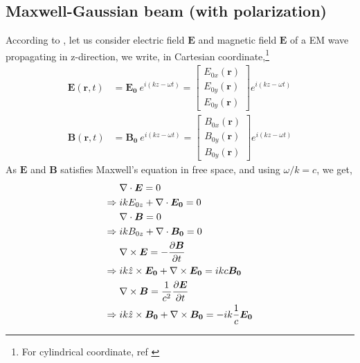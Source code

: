 \documentclass[11pt,a4paper]{article}
\numberwithin{equation}{section}
\begin{document}
\subsection{Maxwell-Gaussian beam (with polarization)}
According to \cite{erikson 94}, let us consider electric field $\boldsymbol{E}$ and magnetic field $\boldsymbol{E}$ of a EM wave propagating in z-direction, we write, in Cartesian coordinate,\footnote{For cylindrical coordinate, ref \cite{lewis 14}}
\begin{align}
	\boldsymbol{E}(\boldsymbol{r},t)
	&= \boldsymbol{E_0}\: e^{i(kz - \omega t)}
	= \begin{bmatrix}
		E_{0x}(\boldsymbol{r})\\E_{0y}(\boldsymbol{r})\\E_{0y}(\boldsymbol{r})
	\end{bmatrix} e^{i(kz - \omega t)}\\
	\boldsymbol{B}(\boldsymbol{r},t)
	&= \boldsymbol{B_0}\: e^{i(kz - \omega t)}
	= \begin{bmatrix}
		B_{0x}(\boldsymbol{r})\\B_{0y}(\boldsymbol{r})\\B_{0y}(\boldsymbol{r})
	\end{bmatrix} e^{i(kz - \omega t)}
\end{align}
As $\boldsymbol{E}$ and $\boldsymbol{B}$ satisfies Maxwell's equation in free space, \cite{max eq - wiki} and using $\omega/k = c$, we get,
\begin{align}
	&\nabla\cdot\boldsymbol{E}=0\\
	\Rightarrow\;& ikE_{0z}+\nabla\cdot\boldsymbol{E_0}=0\label{eq:2.65}\\
	&\nabla\cdot\boldsymbol{B}=0\\
	\Rightarrow\;& ikB_{0z}+\nabla\cdot\boldsymbol{B_0}=0\label{eq:2.67}\\
	&\nabla\times\boldsymbol{E}= -\frac{\partial \boldsymbol{B}}{\partial t}\\
	\Rightarrow\;& ik\Hat{z}\times\boldsymbol{E_0}+ \nabla\times\boldsymbol{E_0}
	=ikc\boldsymbol{B_0}\label{eq:2.69}\\
	&\nabla\times\boldsymbol{B}=\frac{1}{c^2}\frac{\partial\boldsymbol{E}}{\partial t}\\
	\Rightarrow\;& ik\Hat{z}\times\boldsymbol{B_0}+ \nabla\times\boldsymbol{B_0}
	=-ik\frac{1}{c}\boldsymbol{E_0}\label{eq:2.71}
\end{align}
\end{document}
